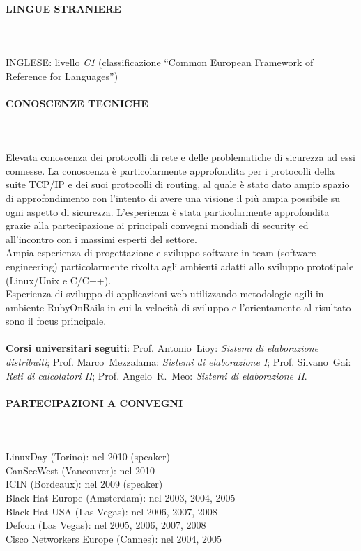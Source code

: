 \documentclass[a4paper, 10pt]{article}
\begin{document}
\paragraph{LINGUE STRANIERE}
\ \\
\ \\
INGLESE: livello \emph{C1} (classificazione ``Common European Framework of
Reference for Languages'')
\\
\paragraph{CONOSCENZE TECNICHE}
\ \\
\ \\
Elevata conoscenza dei protocolli di rete e delle problematiche di sicurezza
ad essi connesse. La conoscenza \`e particolarmente approfondita per i
protocolli della suite TCP/IP e dei suoi protocolli di routing, al quale \`e 
stato dato ampio spazio di approfondimento con l'intento di avere una
visione il pi\`u ampia possibile su ogni aspetto di sicurezza. L'esperienza
\`e stata particolarmente approfondita grazie alla
partecipazione ai principali convegni mondiali di security ed all'incontro
con i massimi esperti del settore.\\
Ampia esperienza di progettazione e sviluppo software in team (software
engineering) particolarmente rivolta agli ambienti adatti allo sviluppo
prototipale (Linux/Unix e C/C++).\\
Esperienza di sviluppo di applicazioni web utilizzando metodologie agili in 
ambiente RubyOnRails in cui la velocit\`a di sviluppo e l'orientamento al
risultato sono il focus principale.
\\
\ \\
\textbf{Corsi universitari seguiti}: Prof. \mbox{Antonio Lioy}: 
\emph{Sistemi di elaborazione 
distribuiti}; Prof. \mbox{Marco Mezzalama}: \emph{Sistemi di elaborazione I}; 
Prof. \mbox{Silvano Gai}: \emph{Reti di calcolatori II}; Prof. \mbox{Angelo
R. Meo}: \emph{Sistemi di elaborazione II}.
\\
\paragraph{PARTECIPAZIONI A CONVEGNI}
\ \\
\ \\
LinuxDay (Torino): nel 2010 (speaker)
\\
CanSecWest (Vancouver): nel 2010
\\
ICIN (Bordeaux): nel 2009 (speaker)
\\
Black Hat Europe (Amsterdam): nel 2003, 2004, 2005
\\
Black Hat USA (Las Vegas): nel 2006, 2007, 2008
\\
Defcon (Las Vegas): nel 2005, 2006, 2007, 2008
\\
Cisco Networkers Europe (Cannes): nel 2004, 2005
\\
\end{document}
